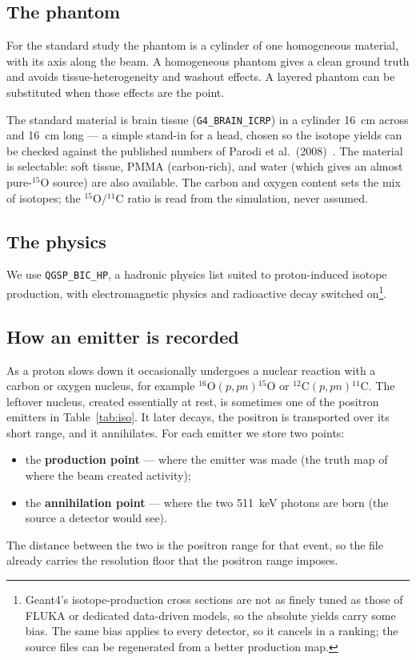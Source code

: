 \documentclass[11pt]{article}
\newcommand{\Cl}[1]{{}^{#1}\mathrm{C}}
\newcommand{\Ox}[1]{{}^{#1}\mathrm{O}}
\begin{document}
\subsection{The phantom}
\label{sec:phantom}
For the standard study the phantom is a cylinder of one homogeneous material, with its
axis along the beam. A homogeneous phantom gives a clean ground truth and avoids
tissue-heterogeneity and washout effects. A layered phantom can be substituted when
those effects are the point.

The standard material is brain tissue (\texttt{G4\_BRAIN\_ICRP}) in a cylinder
\SI{16}{cm} across and \SI{16}{cm} long --- a simple stand-in for a head, chosen so
the isotope yields can be checked against the published numbers of Parodi et al.\
(2008)~\cite{parodi2008comparison}. The material is selectable: soft tissue, PMMA
(carbon-rich), and water (which gives an almost pure-$\Ox{15}$ source) are also
available. The carbon and oxygen content sets the mix of isotopes; the
$\Ox{15}/\Cl{11}$ ratio is read from the simulation, never assumed.

\subsection{The physics}
\label{sec:physics}
We use \texttt{QGSP\_BIC\_HP}, a hadronic physics list suited to proton-induced
isotope production, with electromagnetic physics and radioactive decay switched on\footnote{Geant4's isotope-production cross sections are not
as finely tuned as those of FLUKA or dedicated data-driven models, so the absolute yields carry
some bias. The same bias applies to every detector, so it cancels in a ranking; the source
files can be regenerated from a better production map.}.

\subsection{How an emitter is recorded}
\label{sec:production}
As a proton slows down it occasionally undergoes a nuclear reaction with a carbon or
oxygen nucleus, for example $\Ox{16}(p,pn)\Ox{15}$ or $\Cl{12}(p,pn)\Cl{11}$. The
leftover nucleus, created essentially at rest, is sometimes one of the positron
emitters in Table~\ref{tab:iso}. It later decays, the positron is transported over
its short range, and it annihilates. For each emitter we store two points:
\begin{itemize}[nosep]
\item the \textbf{production point} --- where the emitter was made (the truth map of
where the beam created activity);
\item the \textbf{annihilation point} --- where the two \SI{511}{keV} photons are born
(the source a detector would see).
\end{itemize}
The distance between the two is the positron range for that event, so the file already
carries the resolution floor that the positron range imposes.
\end{document}
